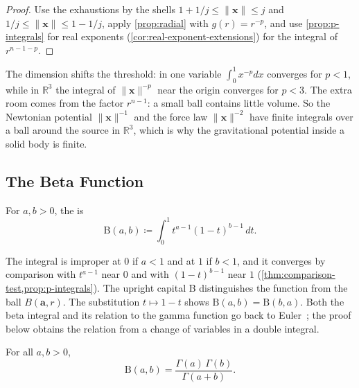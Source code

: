 \begin{proof}
Use the exhaustions by the shells $1+1/j\le\|\mathbf x\|\le j$ and $1/j\le\|\mathbf x\|\le1-1/j$, apply \cref{prop:radial} with $g(r)=r^{-p}$, and use \cref{prop:p-integrals} for real exponents (\cref{cor:real-exponent-extensions}) for the integral of $r^{n-1-p}$.
\end{proof}

The dimension shifts the threshold: in one variable $\int_0^1x^{-p}dx$ converges for $p<1$, while in $\mathbb R^3$ the integral of $\|\mathbf x\|^{-p}$ near the origin converges for $p<3$. The extra room comes from the factor $r^{n-1}$: a small ball contains little volume. So the Newtonian potential $\|\mathbf x\|^{-1}$ and the force law $\|\mathbf x\|^{-2}$ have finite integrals over a ball around the source in $\mathbb R^3$, which is why the gravitational potential inside a solid body is finite.

\subsection{The Beta Function}

\begin{definition}
\label{def:beta}
For $a,b>0$, the  is
\[
\mathrm B(a,b)\coloneqq\int_0^1t^{a-1}(1-t)^{b-1}\,dt .
\]
\end{definition}

The integral is improper at $0$ if $a<1$ and at $1$ if $b<1$, and it converges by comparison with $t^{a-1}$ near $0$ and with $(1-t)^{b-1}$ near $1$ (\cref{thm:comparison-test,prop:p-integrals}). The upright capital B distinguishes the function from the ball $B(\mathbf a,r)$. The substitution $t\mapsto1-t$ shows $\mathrm B(a,b)=\mathrm B(b,a)$. Both the beta integral and its relation to the gamma function go back to Euler~\cite{davis1959gamma}; the proof below obtains the relation from a change of variables in a double integral.

\begin{theorem}
\label{thm:beta-gamma}
For all $a,b>0$,
\[
\mathrm B(a,b)=\frac{\Gamma(a)\,\Gamma(b)}{\Gamma(a+b)} .
\]
\end{theorem}

